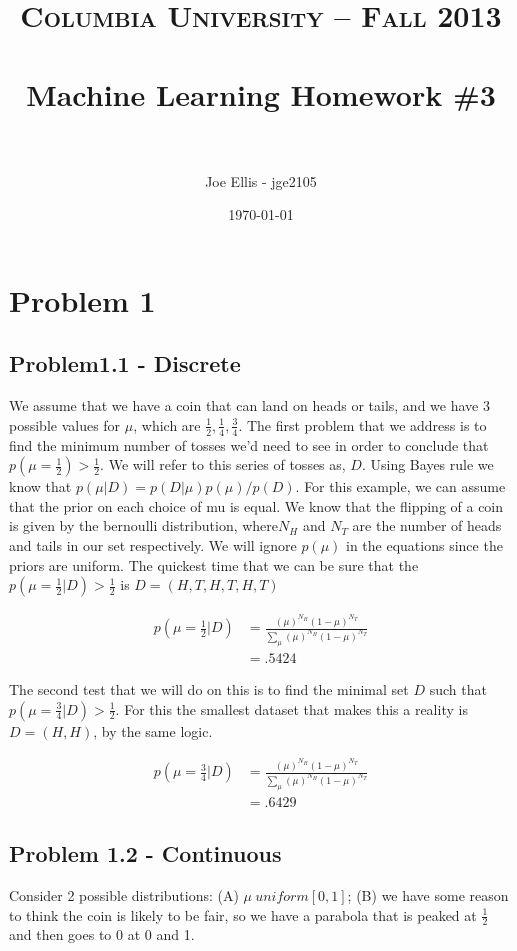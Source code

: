 \documentclass[paper=a4, fontsize=11pt]{scrartcl} %
\title{	
\normalfont \normalsize 
\textsc{Columbia University -- Fall 2013} \\ [25pt] %
\horrule{0.5pt} \\[0.4cm] %
\huge Machine Learning Homework \#3\\ %
\horrule{2pt} \\[0.5cm] %
}
\author{Joe Ellis - jge2105} %
\date{\normalsize\today} %
\begin{document}
\maketitle %


\section{Problem 1}
\subsection{Problem1.1 - Discrete}
We assume that we have a coin that can land on heads or tails, and we have 3 possible values for $\mu$, which are $\frac{1}{2},\frac{1}{4},\frac{3}{4}$. 
 The first problem that we address is to find the minimum number of tosses we'd need to see in order to conclude that $p(\mu = \frac{1}{2}) > \frac{1}{2}$.
We will refer to this series of tosses as, $D$.  Using Bayes rule we know that $p(\mu|D) = p(D|\mu)p(\mu)/p(D)$.  
For this example, we can assume that the prior on each choice of mu is equal.  We know that the flipping of a coin is given by the bernoulli distribution, where$ N_{H}$ and $N_{T}$ are the number of heads and tails in our set respectively.
We will ignore $p(\mu)$ in the equations since the priors are uniform.
The quickest time that we can be sure that the $p(\mu=\frac{1}{2}|D) > \frac{1}{2}$ is $D = (H,T,H,T,H,T)$

\begin{align}
p(\mu=\frac{1}{2}|D) &= \frac{(\mu)^{N_{H}}(1-\mu)^{N_{T}}}{\sum\limits_{\mu} (\mu)^{N_{H}}(1-\mu)^{N_{T}}  } \\
&= .5424
\end{align}
 
The second test that we will do on this is to find the minimal set $D$ such that $p(\mu = \frac{3}{4} | D) > \frac{1}{2}$. 
 For this the smallest dataset that makes this a reality is $D = (H,H)$, by the same logic.

\begin{align}
p(\mu=\frac{3}{4}|D) &= \frac{(\mu)^{N_{H}}(1-\mu)^{N_{T}}}{\sum\limits_{\mu} (\mu)^{N_{H}}(1-\mu)^{N_{T}}  } \\
&= .6429
\end{align}

\subsection{Problem 1.2 - Continuous}
 Consider 2 possible distributions: (A) $\mu ~ uniform[0,1]$; (B) we have some reason to think the coin is likely to be fair, so we have a parabola that is peaked at $\frac{1}{2}$ and then goes to 0 at 0 and 1.
\end{document}
